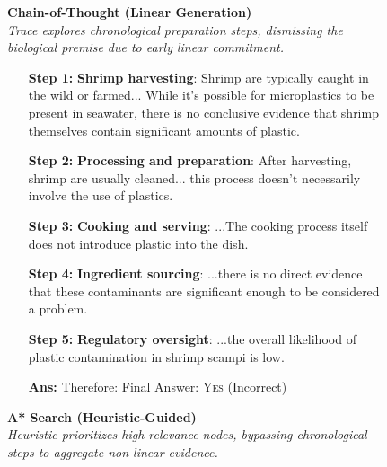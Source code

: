 \documentclass[11pt]{article}
\begin{document}
\begin{figure}[t]
\centering
\begin{tcolorbox}[
    enhanced,
    breakable,
    colback=white,
    colframe=black!75,
    arc=2mm,
    boxrule=0.7pt,
    title=\textbf{Motivating Example:} \emph{``Is shrimp scampi definitely free of plastic?''} \hfill (Gold: \textsc{False}),
    colbacktitle=black!5,
    coltitle=black,
    fonttitle=\small,
    left=6pt, right=6pt, top=6pt, bottom=6pt
]
\small

\begin{minipage}[t]{0.48\textwidth}
\textbf{\color{red!80!black}  Chain-of-Thought (Linear Generation)} \\[4pt]
\textit{Trace explores chronological preparation steps, dismissing the biological premise due to early linear commitment.} \\[-2pt]
\begin{itemize}
    \setlength{\itemsep}{2pt}
    \item[\textbf{Step 1:}] \textbf{Shrimp harvesting}: Shrimp are typically caught in the wild or farmed... While it's possible for microplastics to be present in seawater, there is no conclusive evidence that shrimp themselves contain significant amounts of plastic.
    \item[\textbf{Step 2:}] \textbf{Processing and preparation}: After harvesting, shrimp are usually cleaned... this process doesn't necessarily involve the use of plastics.
    \item[\textbf{Step 3:}] \textbf{Cooking and serving}: ...The cooking process itself does not introduce plastic into the dish.
    \item[\textbf{Step 4:}] \textbf{Ingredient sourcing}: ...there is no direct evidence that these contaminants are significant enough to be considered a problem.
    \item[\textbf{Step 5:}] \textbf{Regulatory oversight}: ...the overall likelihood of plastic contamination in shrimp scampi is low.
    \item[\textbf{Ans:}] Therefore: Final Answer: \textsc{Yes} (Incorrect)
\end{itemize}
\end{minipage}
\hfill
\vrule
\hfill
\begin{minipage}[t]{0.48\textwidth}
\textbf{\color{blue!80!black}  A* Search (Heuristic-Guided)} \\[4pt]
\textit{Heuristic prioritizes high-relevance nodes, bypassing chronological steps to aggregate non-linear evidence.} \\[-2pt]

\end{minipage}
\end{tcolorbox}
\end{figure}
\end{document}
